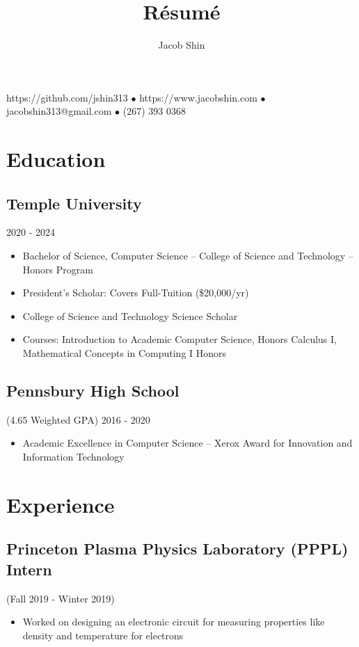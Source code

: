 \documentclass{article}
\makeatletter
\renewcommand{\maketitle}{
    \begin{center}
        {\huge\bfseries
        \theauthor}
    \end{center}
    \begin{center}
        \vspace{1em}
        \leavevmode
        https://github.com/jshin313 $\bullet$ https://www.jacobshin.com $\bullet$ jacobshin313@gmail.com $\bullet$ (267) 393 0368
        \vspace{1em}
        \\
    \end{center}
}
\makeatother
\begin{document}
\title{R\'esum\'e}
\author{Jacob Shin}

\maketitle
\section{Education}
\subsection{Temple University}\hspace{31em} 2020 - 2024
\begin{itemize}
    \item Bachelor of Science, Computer Science -- College of Science and Technology -- Honors Program
    \item President's Scholar: Covers Full-Tuition (\$20,000/yr)
    \item College of Science and Technology Science Scholar
    \item Courses: Introduction to Academic Computer Science, Honors Calculus I, Mathematical Concepts in Computing I Honors 
\end{itemize}

\subsection{Pennsbury High School}(4.65 Weighted GPA)\hspace{19em} 2016 - 2020
\begin{itemize}
    \item Academic Excellence in Computer Science -- Xerox Award for Innovation and Information Technology
\end{itemize}

\section{Experience}
\subsection{Princeton Plasma Physics Laboratory (PPPL) Intern} (Fall 2019 - Winter 2019)
\begin{itemize}
    \item Worked on designing an electronic circuit for measuring properties like density and temperature for electrons
\end{itemize}
\end{document}
